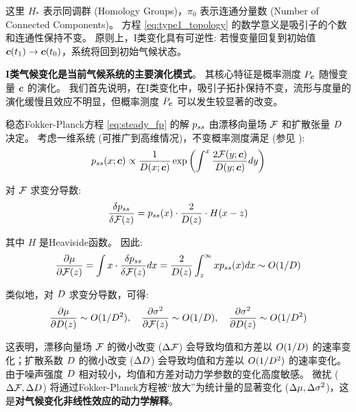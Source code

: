 这里 $H_*$ 表示同调群 (Homology Groups)，$\pi_0$ 表示连通分量数 (Number of Connected Components)。
方程 \eqref{eq:type1_topology} 的数学意义是吸引子的个数和连通性保持不变。
原则上，I类变化具有可逆性: 若慢变量回复到初始值 $\bm{c}(t_1) \to \bm{c}(t_0)$，系统将回到初始气候状态。

\textbf{I类气候变化是当前气候系统的主要演化模式}。
其核心特征是概率测度 $P_{\bm{c}}$ 随慢变量 $\bm{c}$ 的演化。
我们首先说明，在I类变化中，吸引子拓扑保持不变，流形与度量的演化缓慢且效应不明显，但概率测度 $P_{\bm{c}}$ 可以发生较显著的改变。

稳态Fokker-Planck方程 \eqref{eq:steady_fp} 的解 $p_{ss}$ 由漂移向量场 $\mathcal{F}$ 和扩散张量 $D$ 决定。
考虑一维系统 (可推广到高维情况)，不变概率测度满足 (参见 \cite{gardiner2009stochastic}):
\begin{equation}
\label{eq:steady_fp_solution}
    p_{ss}(x; \bm{c}) \propto \frac{1}{D(x; \bm{c})} \exp\left(\int^x \frac{2\mathcal{F}(y; \bm{c})}{D(y; \bm{c})} dy\right)
\end{equation}

对 $\mathcal{F}$ 求变分导数:
\begin{equation}
\label{eq:sensitivity_mean_partial_f}
    \frac{\delta p_{ss}}{\delta \mathcal{F}(z)} = p_{ss}(x) \cdot \frac{2}{D(z)} \cdot H(x - z)
\end{equation}

其中 $H$ 是Heaviside函数。
因此:
\begin{equation}
    \frac{\partial \mu}{\partial \mathcal{F}(z)} = \int x \cdot \frac{\delta p_{ss}}{\delta \mathcal{F}(z)} dx = \frac{2}{D(z)} \int_{z}^{\infty} x p_{ss}(x) dx \sim O(1/D)
\end{equation}

类似地，对 $D$ 求变分导数，可得:
\begin{equation}
    \frac{\partial \mu}{\partial D(z)} \sim O(1/D^2), \quad \frac{\partial \sigma^2}{\partial \mathcal{F}(z)} \sim O(1/D), \quad \frac{\partial \sigma^2}{\partial D(z)} \sim O(1/D^2)
\end{equation}

这表明，漂移向量场 $\mathcal{F}$ 的微小改变 ($\Delta \mathcal{F}$) 会导致均值和方差以 $O(1/D)$ 的速率变化；扩散系数 $D$ 的微小改变 ($\Delta D$) 会导致均值和方差以 $O(1/D^2)$ 的速率变化。
由于噪声强度 $D$ 相对较小，均值和方差对动力学参数的变化高度敏感。
微扰 ($\Delta \mathcal{F}, \Delta D$) 将通过Fokker-Planck方程被“放大”为统计量的显著变化 ($\Delta \mu, \Delta \sigma^2$)，这是\textbf{对气候变化非线性效应的动力学解释}。

